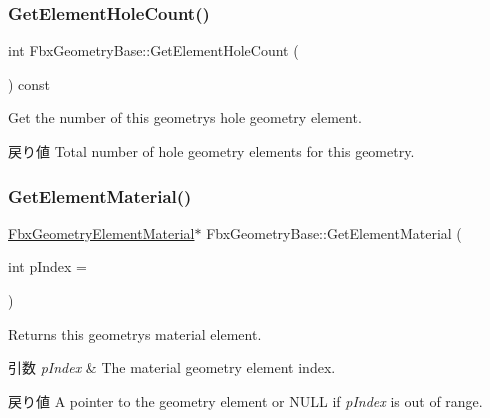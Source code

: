 \subsubsection{\texorpdfstring{Get\+Element\+Hole\+Count()}{GetElementHoleCount()}}
{\footnotesize\ttfamily int Fbx\+Geometry\+Base\+::\+Get\+Element\+Hole\+Count (\begin{DoxyParamCaption}{ }\end{DoxyParamCaption}) const}

Get the number of this geometry\textquotesingle{}s hole geometry element. \begin{DoxyReturn}{戻り値}
Total number of hole geometry elements for this geometry. 
\end{DoxyReturn}
\mbox{\label{class_fbx_geometry_base_ac49c730d0f134f1aff416bc4be5ca4e5}} 
\subsubsection{\texorpdfstring{Get\+Element\+Material()}{GetElementMaterial()}\hspace{0.1cm}{\footnotesize\ttfamily [1/2]}}
{\footnotesize\ttfamily \hyperlink{fbxlayer_8h_a1a779f3f614dbf0024c07f4a1d8332f4}{Fbx\+Geometry\+Element\+Material}$\ast$ Fbx\+Geometry\+Base\+::\+Get\+Element\+Material (\begin{DoxyParamCaption}\item[{int}]{p\+Index = {} }\end{DoxyParamCaption})}

Returns this geometry\textquotesingle{}s material element. 
\begin{DoxyParams}{引数}
{\em p\+Index} & The material geometry element index. \\
\hline
\end{DoxyParams}
\begin{DoxyReturn}{戻り値}
A pointer to the geometry element or {\ttfamily N\+U\+LL} if {\itshape p\+Index} is out of range. 
\end{DoxyReturn}
\mbox{\label{class_fbx_geometry_base_acd0f6cd7ecaa99d15aab3e211857f462}} 
